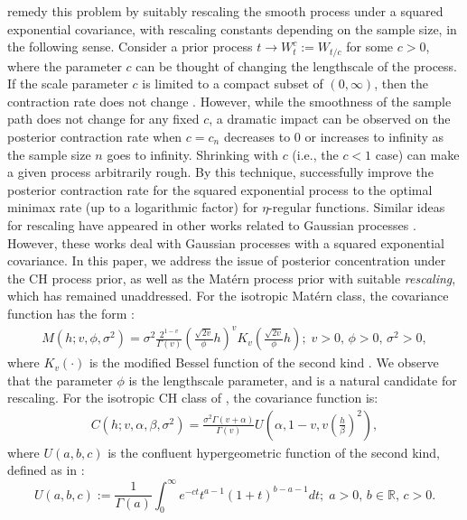 \documentclass[ejs,noshowframe]{imsart}
\theoremstyle{plain}
\theoremstyle{definition}
\theoremstyle{remark}
\begin{document}
\cite{van2007bayesian} remedy this  problem by suitably rescaling the smooth process under a squared exponential covariance, with rescaling constants depending on the sample size, in the following sense.  Consider a prior
process $t \to W_t^c:= W_{t/c}$  for some $c>0$, where the parameter $c$ can be thought of changing the lengthscale of the process. If the scale parameter $c$ is limited to a compact subset of $(0,\infty)$, then
the contraction rate does not change \citep{van2008rates}. However, while the  smoothness of the sample path does not change for any fixed $c$, a dramatic impact can be observed on the posterior contraction rate  when $c = c_n$ decreases to $0$ or increases to infinity as the sample size $n$ goes to infinity.  Shrinking with $c$ (i.e., the $c<1$ case) can make a given process arbitrarily rough. By this technique, \cite{van2007bayesian} successfully improve the posterior contraction rate for the squared exponential process to the optimal minimax rate (up to a logarithmic factor) for $\eta$-regular functions. Similar ideas for rescaling have appeared in other works related to Gaussian processes \citep{pati2015optimal,10.1214/20-AOS2043}. However, these works deal with  Gaussian processes with a squared exponential covariance.  In this paper, we address the issue of posterior concentration under  the CH process prior, as well as the Mat\'ern process prior with suitable \emph{rescaling}, which has remained unaddressed.   For the isotropic Mat\'ern class, the covariance
function has the form \citep{williams2006gaussian}:
\begin{eqnarray}
M(h;v,\phi,\sigma^2)=\sigma^2 \frac{2^{1-v}}{\Gamma(v)}\left(\frac{\sqrt{2v}}{\phi} h \right)^v {K}_v\left( \frac{\sqrt{2v}}{\phi} h \right);\; v>0,\, \phi>0,\, \sigma^2>0,\label{eq:Matern}
\end{eqnarray}  
where $K_v(\cdot)$ is the modified Bessel function of the second kind \citep[][Section 9.6]{abramowitz1988handbook}. We observe that the parameter $\phi$ is the lengthscale parameter, and is a natural candidate for rescaling. For the isotropic CH class of \cite{ma2022beyond}, the covariance function is:
\begin{eqnarray}
    C(h;v,\alpha,\beta,\sigma^2)=\frac{\sigma^2 \Gamma(v+\alpha)}{\Gamma(v)}U\left(\alpha,1-v,v\left(\frac{h}{\beta}\right)^2\right),\label{eq:CH}
\end{eqnarray}    
where $U(a,b,c)$ is the confluent hypergeometric function of the second kind, defined as in \citet[][Section 13.2]{abramowitz1988handbook}: 
\begin{displaymath}
   U(a,b,c) :=\frac{1}{\Gamma(a)} \int_{0}^{\infty} e^{-ct}t^{a-1}(1+t)^{b-a-1}dt;\; a>0,\, b\in\mathbb{R},\, c>0.
\end{displaymath}
\end{document}
